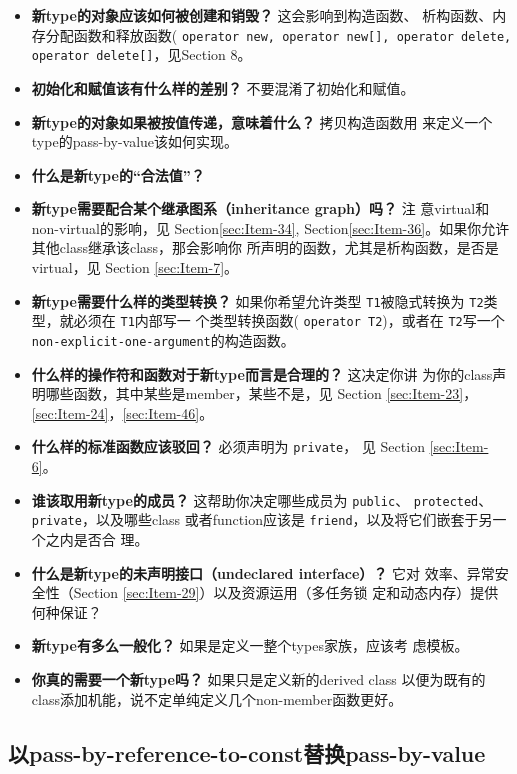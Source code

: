 \documentclass[a4paper,twoside]{article}
\theoremstyle{definition}
\theoremstyle{remark}
\numberwithin{equation}{section}
\let\OldTexttt\texttt
\renewcommand{\texttt}[1]{{\color{blue} \OldTexttt{#1}}}
\begin{document}
\begin{itemize}
\item \textbf{新type的对象应该如何被创建和销毁？} 这会影响到构造函数、
  析构函数、内存分配函数和释放函数(\texttt{operator new, operator
    new[], operator delete, operator delete[]}，见Section 8。
\item \textbf{初始化和赋值该有什么样的差别？} 不要混淆了初始化和赋值。
\item \textbf{新type的对象如果被按值传递，意味着什么？} 拷贝构造函数用
  来定义一个type的pass-by-value该如何实现。
\item \textbf{什么是新type的“合法值”？}
\item\textbf{ 新type需要配合某个继承图系（inheritance graph）吗？} 注
  意virtual和non-virtual的影响，见 Section\ref{sec:Item-34},
  Section\ref{sec:Item-36}。如果你允许其他class继承该class，那会影响你
  所声明的函数，尤其是析构函数，是否是virtual，见 Section
  \ref{sec:Item-7}。
\item \textbf{新type需要什么样的类型转换？} 如果你希望允许类型
  \texttt{T1}被隐式转换为\texttt{T2}类型，就必须在\texttt{T1}内部写一
  个类型转换函数(\texttt{operator T2})，或者在\texttt{T2}写一个
  \texttt{non-explicit-one-argument}的构造函数。
\item \textbf{什么样的操作符和函数对于新type而言是合理的？} 这决定你讲
  为你的class声明哪些函数，其中某些是member，某些不是，见 Section
  \ref{sec:Item-23}，\ref{sec:Item-24}，\ref{sec:Item-46}。
\item \textbf{什么样的标准函数应该驳回？} 必须声明为\texttt{private}，
  见 Section \ref{sec:Item-6}。
\item \textbf{谁该取用新type的成员？} 这帮助你决定哪些成员为
  \texttt{public}、\texttt{protected}、\texttt{private}，以及哪些class
  或者function应该是\texttt{friend}，以及将它们嵌套于另一个之内是否合
  理。
\item \textbf{什么是新type的未声明接口（undeclared interface）？} 它对
  效率、异常安全性（Section \ref{sec:Item-29}）以及资源运用（多任务锁
  定和动态内存）提供何种保证？
\item \textbf{新type有多么一般化？} 如果是定义一整个types家族，应该考
  虑模板。
\item \textbf{你真的需要一个新type吗？} 如果只是定义新的derived class
  以便为既有的class添加机能，说不定单纯定义几个non-member函数更好。
\end{itemize}

\subsection{以pass-by-reference-to-const替换pass-by-value}
\label{sec:Item-20}
\end{document}
